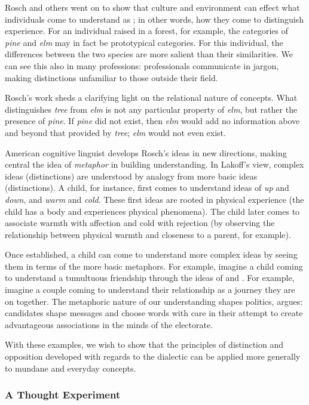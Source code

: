 Rosch and others went on to show that culture and environment can effect what individuals come to understand as ; in other words, how they come to distinguish experience.
For an individual raised in a forest, for example, the categories of \textit{pine} and \textit{elm} may in fact be prototypical categories.
For this individual, the differences between the two species are more salient than their similarities.
We can see this also in many professions: professionals communicate in jargon, making distinctions unfamiliar to those outside their field.

Rosch's work sheds a clarifying light on the relational nature of concepts.
What distinguishes \textit{tree} from \textit{elm} is not any particular property of \textit{elm}, but rather the presence of \textit{pine}.
If \textit{pine} did not exist, then \textit{elm} would add no information above and beyond that provided by \textit{tree}; \textit{elm} would not even exist.

American cognitive linguist \citet{lakoff03} develops Rosch's ideas in new directions, making central the idea of \textit{metaphor} in building understanding.
In Lakoff's view, complex ideas (distinctions) are understood by analogy from more basic ideas (distinctions).
A child, for instance, first comes to understand ideas of \textit{up} and \textit{down}, and \textit{warm} and \textit{cold}.
These first ideas are rooted in physical experience (the child has a body and experiences physical phenomena).
The child later comes to associate warmth with affection and cold with rejection (by observing the relationship between physical warmth and closeness to a parent, for example).

Once established, a child can come to understand more complex ideas by seeing them in terms of the more basic metaphors.
For example, imagine a child coming to understand a tumultuous friendship through the ideas of  and .
For example, imagine a couple coming to understand their relationship as a journey they are on together.
The metaphoric nature of our understanding shapes politics, \citet{lakoff14} argues: candidates shape messages and choose words with care in their attempt to create advantageous associations in the minds of the electorate.

With these examples, we wish to show that the principles of distinction and opposition developed with regards to the dialectic can be applied more generally to mundane and everyday concepts.

\subsubsection{A Thought Experiment}

